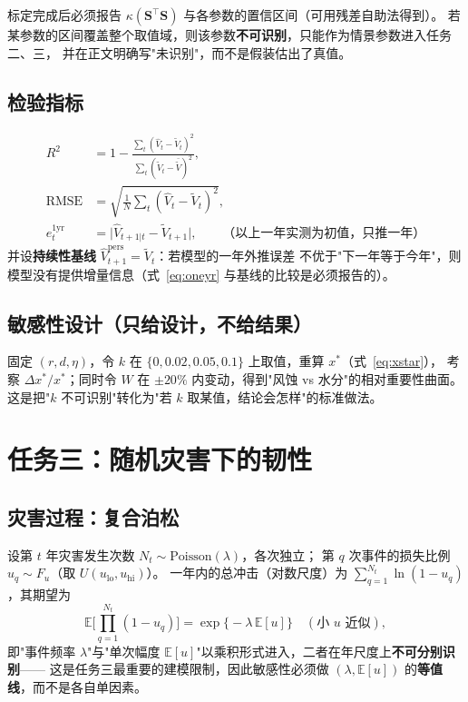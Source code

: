 \documentclass[11pt,a4paper]{ctexart}
\newcommand{\E}{\mathbb{E}}
\begin{document}
标定完成后必须报告 $\kappa(\bm{S}^{\top}\bm{S})$ 与各参数的置信区间（可用残差自助法得到）。
若某参数的区间覆盖整个取值域，则该参数\textbf{不可识别}，只能作为情景参数进入任务二、三，
并在正文明确写"未识别"，而不是假装估出了真值。

\subsection{检验指标}

\begin{align}
R^2&=1-\frac{\sum_t(\hat V_t-\tilde V_t)^2}{\sum_t(\tilde V_t-\bar{\tilde V})^2},\label{eq:r2}\\
\mathrm{RMSE}&=\sqrt{\tfrac{1}{N}\sum_t(\hat V_t-\tilde V_t)^2},\label{eq:rmse}\\
e^{\mathrm{1yr}}_t&=\big|\hat V_{t+1|t}-\tilde V_{t+1}\big|,\qquad
\text{（以上一年实测为初值，只推一年）}\label{eq:oneyr}
\end{align}
并设\textbf{持续性基线} $\hat V^{\mathrm{pers}}_{t+1}=\tilde V_t$：若模型的一年外推误差
不优于"下一年等于今年"，则模型没有提供增量信息（式~\eqref{eq:oneyr} 与基线的比较是必须报告的）。

\subsection{敏感性设计（只给设计，不给结果）}

固定 $(r,d,\eta)$，令 $k$ 在 $\{0,0.02,0.05,0.1\}$ 上取值，重算 $x^*$（式~\eqref{eq:xstar}），
考察 $\Delta x^*/x^*$；同时令 $W$ 在 $\pm20\%$ 内变动，得到"风蚀 vs 水分"的相对重要性曲面。
这是把"$k$ 不可识别"转化为"若 $k$ 取某值，结论会怎样"的标准做法。



\section{任务三：随机灾害下的韧性}\label{sec:t3}

\subsection{灾害过程：复合泊松}

设第 $t$ 年灾害发生次数 $N_t\sim\mathrm{Poisson}(\lambda)$，各次独立；
第 $q$ 次事件的损失比例 $u_q\sim F_u$（取 $U(u_{\mathrm{lo}},u_{\mathrm{hi}})$）。
一年内的总冲击（对数尺度）为 $\sum_{q=1}^{N_t}\ln(1-u_q)$，其期望为
\begin{equation}\label{eq:compound}
\E\Big[\prod_{q=1}^{N_t}(1-u_q)\Big]
=\exp\Big\{-\lambda\,\E[u]\Big\}\quad(\text{小 }u\text{ 近似}),
\end{equation}
即"事件频率 $\lambda$"与"单次幅度 $\E[u]$"以乘积形式进入，二者在年尺度上\textbf{不可分别识别}——
这是任务三最重要的建模限制，因此敏感性必须做 $(\lambda,\E[u])$ 的\textbf{等值线}，而不是各自单因素。
\end{document}
